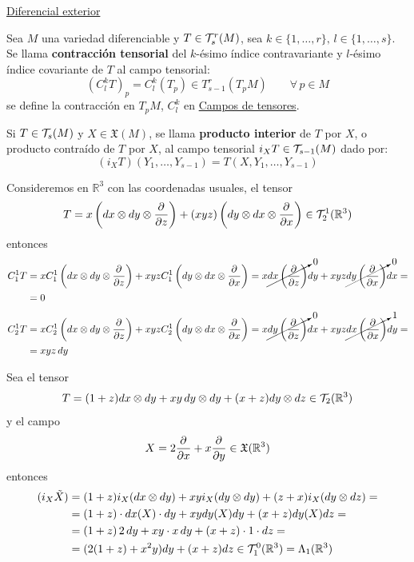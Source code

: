 \hyperref[ap4]{Diferencial exterior}
\begin{defi}
    Sea $M$ una variedad diferenciable y $T\in \mathcal{T}_s^r(M)$, sea $k \in \{1,\ldots, r\}, \, l\in \{1,\ldots, s\}$. Se llama \textbf{contracci\'on tensorial} del $k$-\'esimo \'indice contravariante y $l$-\'esimo \'indice covariante de $T$ al campo tensorial:
    $$(C_l^kT)_p=C_l^k(T_p) \in T_{s-1}^r(T_pM) \qquad \forall \, p \in M$$
    se define la contracci\'on en $T_pM$, $C_l^k$ en \hyperref[ap2]{Campos de tensores}.
\end{defi}
\begin{defi}
    Si $T \in \mathcal{T}_s(M)$ y $X\in \mathfrak{X}(M)$, se llama \textbf{producto interior} de $T$ por $X$, o producto contra\'ido de $T$ por $X$, al campo tensorial $i_XT\in \mathcal{T}_{s-1}(M)$ dado por:
    $$(i_XT)(Y_1, \ldots, Y_{s-1})=T(X,Y_1, \ldots, Y_{s-1})$$
\end{defi}
\begin{ejem}
    Consideremos en $\mathbb R^3$ con las coordenadas usuales, el tensor
    $$T = x\left(dx\otimes dy\otimes \dfrac{\partial^{} }{\partial z}\right)  + (xyz)  \left(dy\otimes dx \otimes \dfrac{\partial^{} }{\partial x}\right) \in \mathcal{T}_2^1(\mathbb R^3)$$
    entonces
    \[ \begin{split} C_1^1T & =xC_1^1\left(dx\otimes dy\otimes \dfrac{\partial^{} }{\partial z}\right) + xyzC_1^1 \left(dy\otimes dx \otimes \dfrac{\partial^{} }{\partial x}\right)=x\cancelto{0}{dx \left( \dfrac{\partial^{} }{\partial z} \right)}dy + xyz \cancelto{0}{dy\left(\dfrac{\partial^{} }{\partial x}\right)}dx = \\ & = 0\end{split}\]
    \[\begin{split} C_2^1T & =xC_2^1\left(dx\otimes dy\otimes \dfrac{\partial^{} }{\partial z}\right) + xyzC_2^1 \left(dy\otimes dx \otimes \dfrac{\partial^{} }{\partial x}\right)=x\cancelto{0}{dy \left( \dfrac{\partial^{} }{\partial z} \right)}dx + xyz \cancelto{1}{dx\left(\dfrac{\partial^{} }{\partial x}\right)}dy= \\ & = xyz \, dy\end{split}\]
\end{ejem}
\begin{ejem}
    Sea el tensor
    $$T=(1+z)dx \otimes dy + xy \, dy \otimes dy + (x+z) dy \otimes dz \in \mathcal{T}_2(\mathbb R^3)$$
    y el campo
    $$X=2\dfrac{\partial^{} }{\partial x}+x\dfrac{\partial^{} }{\partial y} \in \mathfrak X(\mathbb R^3)$$
    entonces
    \[\begin{split}
        (i_X \Tilde{X}) & = (1+z)i_X(dx\otimes dy) + xy i_X(dy\otimes dy) + (z+x)i_X(dy\otimes dz) = \\ &= (1+z) \cdot dx(X) \cdot dy + xy dy(X) dy + (x+z) dy(X) dz = \\ & = (1+z) \, 2 \, dy + xy \cdot x \, dy +(x+z) \cdot 1 \cdot dz = \\& = 
        (2(1+z)+x^2y)dy+(x+z)dz \in \mathcal{T}_1^0(\mathbb R^3) = \Lambda_1(\mathbb R^3)
    \end{split}\]
\end{ejem}

